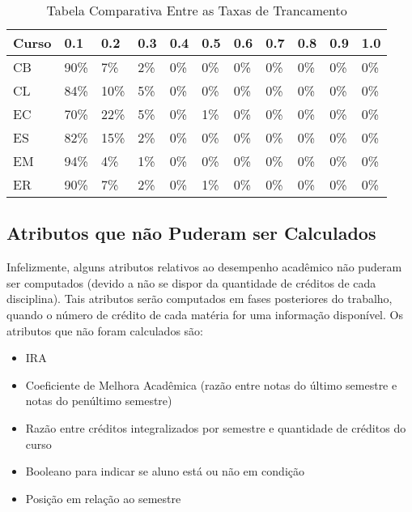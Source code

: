 \begin{table}
\begin{center}
        \begin{tabular}{|p{2cm}| p{1cm}| p{1cm}| p{1cm} | p{1cm} | p{1cm}| p{1cm}
                |p{1cm} | p{1cm} | p{1cm} | p{1cm}|}
        \hline
        \textbf{Curso} & \textbf{0.1} & \textbf{0.2} & \textbf{0.3} & 
        \textbf{0.4} & \textbf{0.5} & \textbf{0.6} & \textbf{0.7} & \textbf{0.8} &
        \textbf{0.9} & \textbf{1.0} \\
        \hline
        \hline
        CB & 90\% & 7\% & 2\% & 0\% & 0\% &
        0\% & 0\% & 0\% & 0\% & 0\% \\
        \hline
        \hline
        CL & 84\% & 10\% & 5\% & 0\% & 0\% &
        0\% & 0\% & 0\% & 0\% & 0\% \\
        \hline
        \hline
        EC & 70\% & 22\% & 5\% & 0\% & 1\% &
        0\% & 0\% & 0\% & 0\% & 0\% \\
        \hline
        \hline
        ES & 82\% & 15\% & 2\% & 0\% & 0\% &
        0\% & 0\% & 0\% & 0\% & 0\% \\
        \hline
        \hline
        EM & 94\% & 4\% & 1\% & 0\% & 0\% &
        0\% & 0\% & 0\% & 0\% & 0\% \\
        \hline
        \hline
        ER & 90\% & 7\% & 2\% & 0\% & 1\% &
        0\% & 0\% & 0\% & 0\% & 0\% \\
        \hline
\end{tabular}
\end{center}
\caption{Tabela Comparativa Entre as Taxas de Trancamento}
\end{table}

\subsection{Atributos que não Puderam ser Calculados} \label{atributos_problematicos}
Infelizmente, alguns atributos relativos ao desempenho acadêmico não puderam ser
computados (devido a não se dispor da quantidade de créditos de cada disciplina).
Tais atributos serão computados em fases posteriores do trabalho, quando o número de
crédito de cada matéria for uma informação disponível. Os atributos que não foram
calculados são: 
\begin{itemize}
    \item IRA
    \item Coeficiente de Melhora Acadêmica (razão entre notas do último semestre e
        notas do penúltimo semestre)
    \item Razão entre créditos integralizados por semestre e quantidade de créditos
        do curso
    \item Booleano para indicar se aluno está ou não em condição
    \item Posição em relação ao semestre
\end{itemize}

